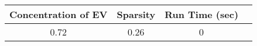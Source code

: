 \begin{tabular}{cccc}
\toprule
 Concentration of EV &  Sparsity & Run Time (sec) \\
\midrule
                0.72 &      0.26 &              0 \\
\bottomrule
\end{tabular}
